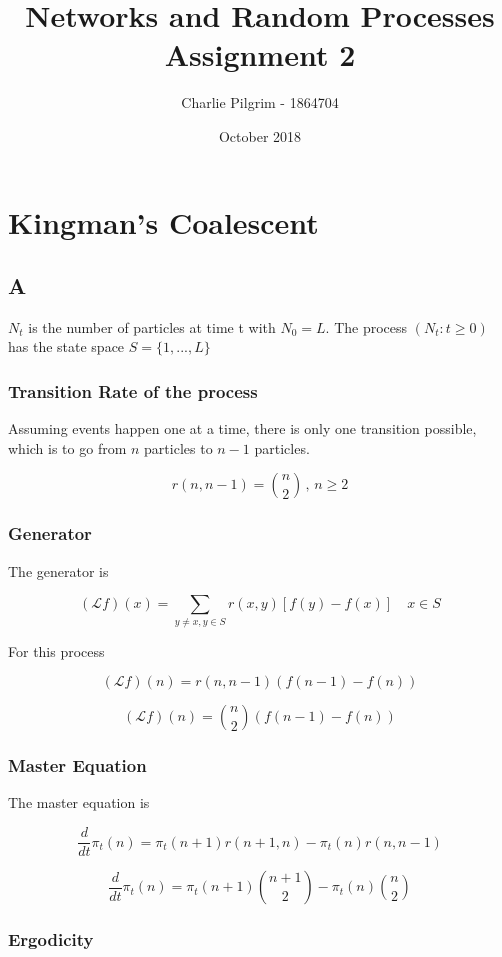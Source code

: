 \documentclass{article}
\title{Networks and Random Processes Assignment 2}
\author{Charlie Pilgrim - 1864704}
\date{October 2018}
\begin{document}
\maketitle


\section{Kingman's Coalescent}

\subsection{A}

$N_t$ is the number of particles at time t with $N_0=L$. The process $(N_t : t \geq 0)$ has the state space $S = \{1,...,L\}$

\subsubsection{Transition Rate of the process}

Assuming events happen one at a time, there is only one transition possible, which is to go from $n$ particles to $n-1$ particles. 

$$r(n,n-1) = {n\choose 2} \, , \, n \geq 2$$

\subsubsection{Generator}

The generator is

$$(\mathcal{L}f)(x) = \sum_{y \neq x , y \in S} r(x,y)[f(y)-f(x)] \quad x \in S$$

For this process

$$(\mathcal{L}f)(n) = r(n,n-1)(f(n-1)-f(n))$$

$$(\mathcal{L}f)(n) = {n\choose 2} (f(n-1)-f(n))$$

\subsubsection{Master Equation}

The master equation is

$$\frac{d}{dt} \pi_t(n) = \pi_t(n+1)r(n+1,n) - \pi_t(n)r(n,n-1)$$

$$\frac{d}{dt} \pi_t(n) = \pi_t(n+1){n+1\choose 2} - \pi_t(n) {n \choose 2}$$

\subsubsection{Ergodicity}
\end{document}
